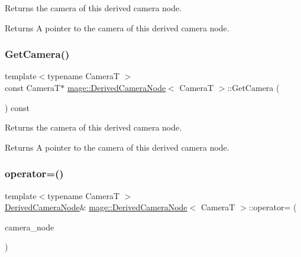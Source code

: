 Returns the camera of this derived camera node.

\begin{DoxyReturn}{Returns}
A pointer to the camera of this derived camera node. 
\end{DoxyReturn}
\hypertarget{classmage_1_1_derived_camera_node_aef2db8d343aeebc95c433150e234481a}{}\label{classmage_1_1_derived_camera_node_aef2db8d343aeebc95c433150e234481a} 
\subsubsection{\texorpdfstring{Get\+Camera()}{GetCamera()}\hspace{0.1cm}{\footnotesize\ttfamily [2/2]}}
{\footnotesize\ttfamily template$<$typename CameraT $>$ \\
const CameraT$\ast$ \hyperlink{classmage_1_1_derived_camera_node}{mage\+::\+Derived\+Camera\+Node}$<$ CameraT $>$\+::Get\+Camera (\begin{DoxyParamCaption}{ }\end{DoxyParamCaption}) const\hspace{0.3cm}{\ttfamily [noexcept]}}

Returns the camera of this derived camera node.

\begin{DoxyReturn}{Returns}
A pointer to the camera of this derived camera node. 
\end{DoxyReturn}
\hypertarget{classmage_1_1_derived_camera_node_a827c7952e061c6e12e38fff12585b3b3}{}\label{classmage_1_1_derived_camera_node_a827c7952e061c6e12e38fff12585b3b3} 
\subsubsection{\texorpdfstring{operator=()}{operator=()}\hspace{0.1cm}{\footnotesize\ttfamily [1/2]}}
{\footnotesize\ttfamily template$<$typename CameraT $>$ \\
\hyperlink{classmage_1_1_derived_camera_node}{Derived\+Camera\+Node}\& \hyperlink{classmage_1_1_derived_camera_node}{mage\+::\+Derived\+Camera\+Node}$<$ CameraT $>$\+::operator= (\begin{DoxyParamCaption}\item[{const \hyperlink{classmage_1_1_derived_camera_node}{Derived\+Camera\+Node}$<$ CameraT $>$ \&}]{camera\+\_\+node }\end{DoxyParamCaption})\hspace{0.3cm}{\ttfamily [delete]}}

